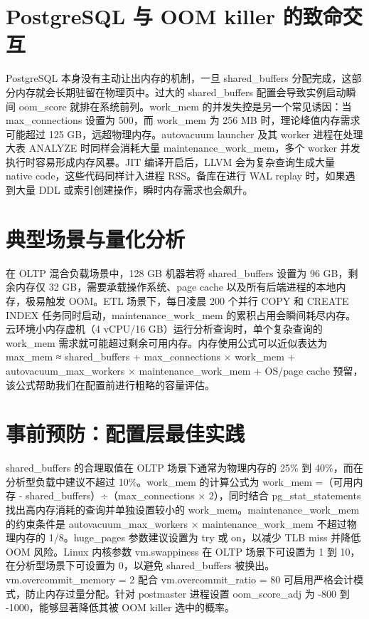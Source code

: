 \chapter{PostgreSQL 与 OOM killer 的致命交互}
PostgreSQL 本身没有主动让出内存的机制，一旦 shared\_{}buffers 分配完成，这部分内存就会长期驻留在物理页中。过大的 shared\_{}buffers 配置会导致实例启动瞬间 oom\_{}score 就排在系统前列。work\_{}mem 的并发失控是另一个常见诱因：当 max\_{}connections 设置为 500，而 work\_{}mem 为 256 MB 时，理论峰值内存需求可能超过 125 GB，远超物理内存。autovacuum launcher 及其 worker 进程在处理大表 ANALYZE 时同样会消耗大量 maintenance\_{}work\_{}mem，多个 worker 并发执行时容易形成内存风暴。JIT 编译开启后，LLVM 会为复杂查询生成大量 native code，这些代码同样计入进程 RSS。备库在进行 WAL replay 时，如果遇到大量 DDL 或索引创建操作，瞬时内存需求也会飙升。\par
\chapter{典型场景与量化分析}
在 OLTP 混合负载场景中，128 GB 机器若将 shared\_{}buffers 设置为 96 GB，剩余内存仅 32 GB，需要承载操作系统、page cache 以及所有后端进程的本地内存，极易触发 OOM。ETL 场景下，每日凌晨 200 个并行 COPY 和 CREATE INDEX 任务同时启动，maintenance\_{}work\_{}mem 的累积占用会瞬间耗尽内存。云环境小内存虚机（4 vCPU/16 GB）运行分析查询时，单个复杂查询的 work\_{}mem 需求就可能超过剩余可用内存。内存使用公式可以近似表达为 max\_{}mem ≈ shared\_{}buffers + max\_{}connections × work\_{}mem + autovacuum\_{}max\_{}workers × maintenance\_{}work\_{}mem + OS/page cache 预留，该公式帮助我们在配置前进行粗略的容量评估。\par
\chapter{事前预防：配置层最佳实践}
shared\_{}buffers 的合理取值在 OLTP 场景下通常为物理内存的 25\%{} 到 40\%{}，而在分析型负载中建议不超过 10\%{}。work\_{}mem 的计算公式为 work\_{}mem =（可用内存 - shared\_{}buffers）÷（max\_{}connections × 2），同时结合 pg\_{}stat\_{}statements 找出高内存消耗的查询并单独设置较小的 work\_{}mem。maintenance\_{}work\_{}mem 的约束条件是 autovacuum\_{}max\_{}workers × maintenance\_{}work\_{}mem 不超过物理内存的 1/8。huge\_{}pages 参数建议设置为 try 或 on，以减少 TLB miss 并降低 OOM 风险。Linux 内核参数 vm.swappiness 在 OLTP 场景下可设置为 1 到 10，在分析型场景下可设置为 0，以避免 shared\_{}buffers 被换出。vm.overcommit\_{}memory = 2 配合 vm.overcommit\_{}ratio = 80 可启用严格会计模式，防止内存过量分配。针对 postmaster 进程设置 oom\_{}score\_{}adj 为 -800 到 -1000，能够显著降低其被 OOM killer 选中的概率。\par
